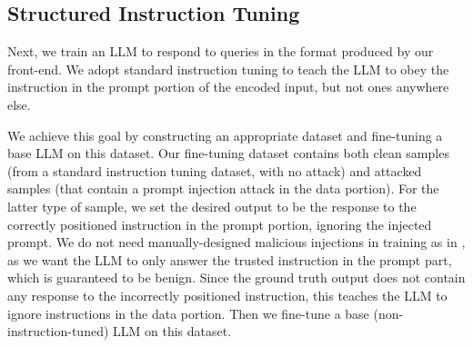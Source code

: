 \subsection{Structured Instruction Tuning}\label{ssec:owning}
Next, we train an LLM to respond to queries in the format produced by our front-end.
We adopt standard instruction tuning to teach the LLM to obey the instruction in the prompt portion of the encoded input, but not ones anywhere else. 

We achieve this goal by constructing an appropriate dataset and fine-tuning a base LLM on this dataset.
Our fine-tuning dataset contains both clean samples (from a standard instruction tuning dataset, with no attack) and attacked samples (that contain a prompt injection attack in the data portion).
For the latter type of sample, we set the desired output to be the response to the correctly positioned instruction in the prompt portion, ignoring the injected prompt.
We do not need manually-designed malicious injections in training as in \cite{yi2023benchmarking}, as we want the LLM to only answer the trusted instruction in the prompt part, which is guaranteed to be benign.
Since the ground truth output does not contain any response to the incorrectly positioned instruction, this teaches the LLM to ignore instructions in the data portion.
Then we fine-tune a base (non-instruction-tuned) LLM on this dataset.

